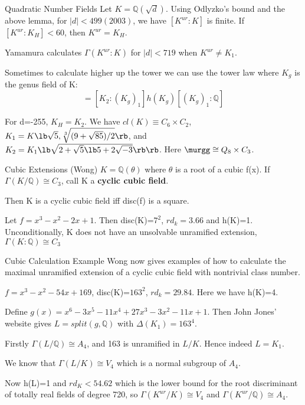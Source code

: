 \documentclass[10pt]{beamer}
\theoremstyle{plain} %
\begin{document}
\begin{frame}{Quadratic Number Fields}
    Let $K=\mathbb{Q}(\sqrt{d})$. Using Odlyzko's bound and the above lemma, for $|d|<499(2003)$, we have $[K^{ur}:K]$ is finite. If $[K^{ur}:K_H]<60$, then $K^{ur}=K_H$.\par
    Yamamura  calculates $\Gamma(K^{ur}:K)$ for $|d|<719$ when $K^{ur}\neq K_1$.\par
    Sometimes to calculate higher up the tower we can use the tower law where $K_g$ is the genus field of K: \begin{equation}
    [K_2:\mathbb{Q}] = [K_2:(K_g)_1]h(K_g)[(K_g)_1:\mathbb{Q}]
\end{equation}\par
\begin{example}
For d=-255, $K_H=K_2$. We have $cl(K)\equiv C_6\times C_2$, $K_1 = K\lb\sqrt{5},\sqrt[3]{(9+\sqrt{85})/2}\rb$, and $K_2 = K_1\lb\sqrt{2+\sqrt{5}\lb5+2\sqrt{-3}}\rb\rb$. Here $\murgg \cong Q_8 \times C_3$.
\end{example}

\end{frame}
\begin{frame}{Cubic Extensions (Wong) }
 $K=\mathbb{Q}(\theta)$ where $\theta$ is a root of a cubic
f(x). If $\Gamma(K/\mathbb{Q}) \cong C_3$, call K a  \textbf{cyclic cubic field}.
\begin{theorem}
Then K is a cyclic cubic field iff disc(f) is a square. 
\end{theorem}
\begin{example}
    Let $f=x^3-x^2-2x+1$. Then disc(K)=$7^2$, $rd_{k}=3.66$ and h(K)=1. Unconditionally, K does not have an unsolvable unramified extension, $\Gamma(K:\mathbb{Q})\cong C_3$
\end{example}
\end{frame}
\begin{frame}{Cubic Calculation Example}
    Wong now gives examples of how to calculate the maximal unramified extension of a cyclic cubic field with nontrivial class number. \begin{example}
    $f=x^3-x^2-54x+169$, disc(K)=$163^2$, $rd_{k}=29.84$. Here we have h(K)=4.\par Define $g(x)=x^6-3x^5-11x^4+27x^3-3x^2-11x+1$. Then John Jones' website gives $L = split(g,\mathbb{Q})$ with $\Delta(K_1)=163^4$.\par Firstly $\Gamma(L/\mathbb{Q}) \cong A_4$, and 163 is unramified in $L/K$. Hence indeed $L=K_1$.\par  We know that $\Gamma(L/K)\cong V_4$ which is a normal subgroup of $A_4$. \par Now h(L)=1 and $rd_K < 54.62$ which is the lower bound for the root discriminant of totally real fields of degree 720, so $\Gamma(K^{ur}/K) \cong V_4$ and $\Gamma(K^{ur}/\mathbb{Q}) \cong A_4$. 
\end{example}
\end{frame}
\end{document}
